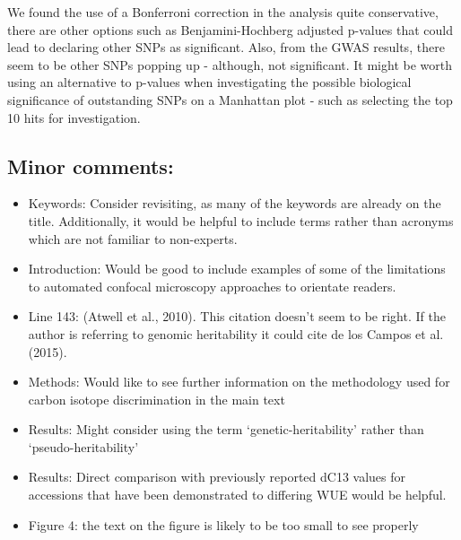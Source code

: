 \documentclass[10pt]{article}
\providecommand{\tightlist}{\setlength{\itemsep}{0pt}\setlength{\parskip}{0pt}}%
\begin{document}
We found the use of a Bonferroni correction in the analysis quite
conservative, there are other options such as Benjamini-Hochberg
adjusted p-values that could lead to declaring other SNPs as
significant. Also, from the GWAS results, there seem to be other SNPs
popping up - although, not significant. It might be worth using an
alternative to p-values when investigating the possible biological
significance of outstanding SNPs on a Manhattan plot - such as selecting
the top 10 hits for investigation.

\par\null

\subsection*{Minor comments:}

{\label{728190}}

\begin{itemize}
\tightlist
\item
  Keywords: Consider revisiting, as many of the keywords are already on
  the title. Additionally, it would be helpful to include terms rather
  than acronyms which are not familiar to non-experts.
\item
  Introduction: Would be good to include examples of some of the
  limitations to automated confocal microscopy approaches to orientate
  readers.
\item
  Line 143: (Atwell et al., 2010). This citation doesn't seem to be
  right. If the author is referring to genomic heritability it could
  cite de los Campos et al. (2015).
\item
  Methods: Would like to see further information on the methodology used
  for carbon isotope discrimination in the main text
\item
  Results: Might consider using the term `genetic-heritability' rather
  than `pseudo-heritability'
\item
  Results: Direct comparison with previously reported dC13 values for
  accessions that have been demonstrated to differing WUE would be
  helpful.
\item
  Figure 4: the text on the figure is likely to be too small to see
  properly
\end{itemize}
\end{document}

